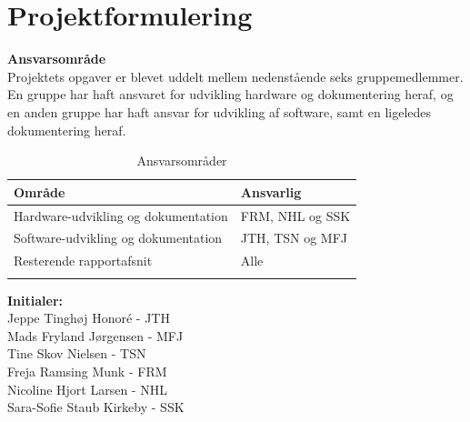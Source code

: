 \chapter{Projektformulering}




\textbf{Ansvarsområde} \\
Projektets opgaver er blevet uddelt mellem nedenstående seks gruppemedlemmer. En gruppe har haft ansvaret for udvikling hardware og dokumentering heraf, og en anden gruppe har haft ansvar for udvikling af software, samt en ligeledes dokumentering heraf. 



\begin{longtabu} to 
    Område &    Ansvarlig\\[-1ex]
    \midrule
	Hardware-udvikling og dokumentation & FRM, NHL og SSK\\
	Software-udvikling og dokumentation & JTH, TSN og MFJ \\
	Resterende rapportafsnit & Alle\\
	\caption{Ansvarsområder}
	\label{Ansvar}
\end{longtabu}

\textbf{Initialer: } \\
Jeppe Tinghøj Honoré - JTH \\
Mads Fryland Jørgensen - MFJ \\
Tine Skov Nielsen - TSN \\
Freja Ramsing Munk - FRM \\
Nicoline Hjort Larsen - NHL \\
Sara-Sofie Staub Kirkeby - SSK \\[2ex]

